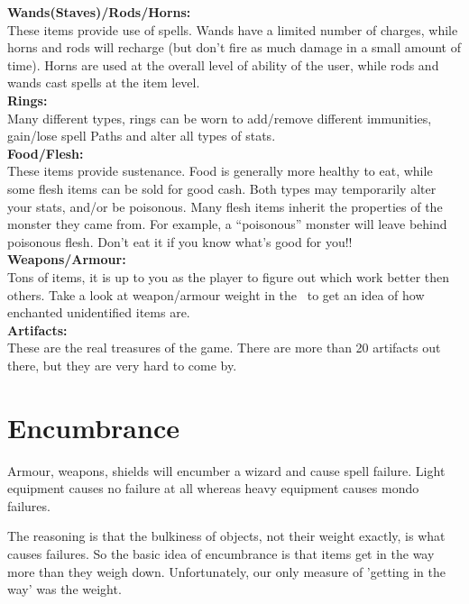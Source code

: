 {\bf Wands(Staves)/Rods/Horns:}
 \\ 
	These items provide use of spells. Wands have a limited
	number of charges, while horns and rods will recharge 
	(but don't fire as much damage in a small amount of time).
	Horns are used at the overall level of ability of the 
	user, while rods and wands cast spells at the item level.\\ 

{\bf Rings:} \\  
     Many different types, rings can be worn to add/remove different
     immunities, gain/lose spell Paths and alter all types of stats. \\ 
 
{\bf Food/Flesh:} \\  
	These items provide sustenance. Food is generally more healthy
	to eat, while some flesh items can be sold for good cash. Both
	types may temporarily alter your stats, and/or be poisonous.
	Many flesh items inherit the properties of the monster they
	came from. For example, a ``poisonous'' monster will leave 
	behind poisonous flesh. Don't eat it if you know what's good
	for you!!\\ 

{\bf Weapons/Armour: }\\ 
     Tons of items, it is up to you as the player to figure out which work
     better then others. Take a look at weapon/armour weight in the \spoiler\ 
	to get an idea of how enchanted unidentified items are. \\ 
 
{\bf Artifacts:}\\ 
     These are the real treasures of the game. There are more than 20
     artifacts out there, but they are very hard to come by. \\ 

\section{Encumbrance}\label{sec:encumberance}
Armour, weapons, shields will encumber a wizard and cause spell 
failure.  Light equipment causes no failure at all whereas heavy equipment 
causes mondo failures.

The reasoning is that the bulkiness of objects, not their weight exactly, is 
what causes failures. So the basic idea of encumbrance is that items get in the 
way more than they weigh down. Unfortunately, our only measure of 'getting 
in the way' was the weight.
 
